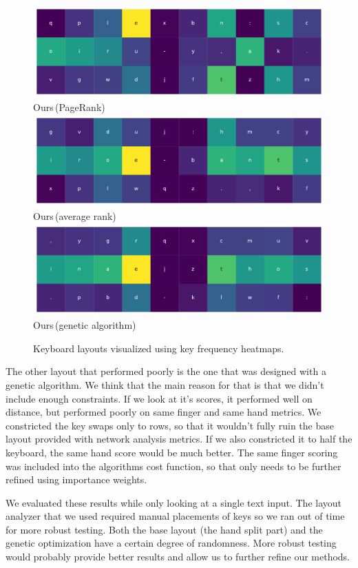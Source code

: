 \documentclass[9pt,twocolumn,twoside]{pnas-report}
\begin{document}
\begin{figure}
    \vskip5pt
    \includegraphics[width=0.8\linewidth]{fig/pagerank}\\
    \small{Ours\,(PageRank)}
    \vskip5pt
    \includegraphics[width=0.8\linewidth]{fig/average}\\
    \small{Ours\,(average rank)}
    \vskip5pt
    \includegraphics[width=0.8\linewidth]{fig/genetic}\\
    \small{Ours\,(genetic algorithm)}
    \caption{Keyboard layouts visualized using key frequency heatmaps.}
    \label{fig:layouts}
\end{figure}

The other layout that performed poorly is the one that was designed with a genetic algorithm.
We think that the main reason for that is that we didn't include enough constraints.
If we look at it's scores, it performed well on distance, but performed poorly on same finger and same hand metrics.
We constricted the key swaps only to rows, so that it wouldn't fully ruin the base layout provided with network analysis metrics.
If we also constricted it to half the keyboard, the same hand score would be much better.
The same finger scoring was included into the algorithms cost function, so that only needs to be further refined using importance weights.

We evaluated these results while only looking at a single text input.
The layout analyzer that we used required manual placements of keys so we ran out of time for more robust testing.
Both the base layout (the hand split part) and the genetic optimization have a certain degree of randomness.
More robust testing would probably provide better results and allow us to further refine our methods.
\end{document}
